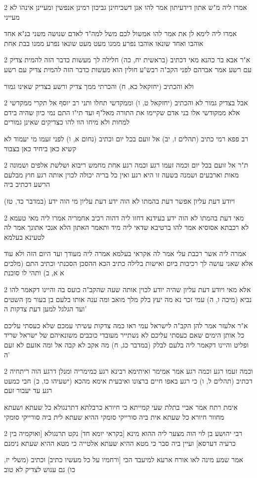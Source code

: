\documentclass[12pt, openany]{book}
\newcommand{\sethebfont}{
\fontsize{10.5pt}{21.0pt} \selectfont
}
\newcommand{\twocol}[1]{
	{\sethebfont \begin{multicols}{2}
			#1
	\end{multicols}}	
}
\begin{document}
\twocol{אמרו ליה מ"ש אתון דידעיתון אמר להו אנן דשכיחינן גביכון רמינן אנפשין ומעיינן אינהו לא מעייני
\par אמרו ליה לימא לן את אמר להו אמשול לכם משל למה"ד לאדם שנושה משני בנ"א אחד אוהבו ואחד שונאו אוהבו נפרע ממנו מעט מעט שונאו נפרע ממנו בבת אחת}
\twocol{א"ר אבא בר כהנא מאי דכתיב (בראשית יח, כה) חלילה לך מעשות כדבר הזה להמית צדיק עם רשע אמר אברהם לפני הקב"ה רבש"ע חולין הוא מעשות כדבר הזה להמית צדיק עם רשע
\par ולא והכתיב (יחזקאל כא, ח) והכרתי ממך צדיק ורשע בצדיק שאינו גמור}
\twocol{אבל בצדיק גמור לא והכתיב (יחזקאל ט, ו) וממקדשי תחלו ותני רב יוסף אל תקרי ממקדשי אלא ממקודשי אלו בני אדם שקיימו את התורה מאל"ף ועד תי"ו התם נמי כיון שהיה בידם למחות ולא מיחו הוו להו כצדיקים שאינן גמורים
\par רב פפא רמי כתיב (תהלים ז, יב) אל זועם בכל יום וכתיב (נחום א, ו) לפני זעמו מי יעמוד לא קשיא כאן ביחיד כאן בצבור}
\twocol{ת"ר אל זועם בכל יום וכמה זעמו רגע וכמה רגע אחת מחמש ריבוא ושלשת אלפים ושמונה מאות וארבעים ושמנה בשעה זו היא רגע ואין כל בריה יכולה לכוין אותה רגע חוץ מבלעם הרשע דכתיב ביה
\par (במדבר כד, טז) ויודע דעת עליון אפשר דעת בהמתו לא הוה ידע דעת עליון מי הוה ידע}
\twocol{מאי דעת בהמתו לא הוה ידע בעידנא דחזו ליה דהוה רכיב אחמריה אמרו ליה מאי טעמא לא רכבתא אסוסיא אמר להו ברטיבא שדאי ליה מיד ותאמר האתון הלא אנכי אתונך אמר לה לטעינא בעלמא
\par אמרה ליה אשר רכבת עלי אמר לה אקראי בעלמא אמרה ליה מעודך ועד היום הזה ולא עוד אלא שאני עושה לך רכיבות ביום ואישות בלילה כתיב הכא ההסכן הסכנתי וכתיב התם (מלכים א א, ב) ותהי לו סוכנת}
\twocol{אלא מאי ויודע דעת עליון שהיה יודע לכוין אותה שעה שהקב"ה כועס בה והיינו דקאמר להו נביא (מיכה ו, ה) עמי זכר נא מה יעץ בלק מלך מואב ומה ענה אותו בלעם בן בעור מן השטים ועד הגלגל למען דעת צדקות ה'
\par א"ר אלעזר אמר להן הקב"ה לישראל עמי ראו כמה צדקות עשיתי עמכם שלא כעסתי עליכם כל אותן הימים שאם כעסתי עליכם לא נשתייר מעובדי כוכבים משונאיהם של ישראל שריד ופליט והיינו דקאמר ליה בלעם לבלק (במדבר כג, ח) מה אקב לא קבה אל ומה אזעם לא זעם ה'}
\twocol{וכמה זעמו רגע וכמה רגע אמר אמימר ואיתימא רבינא רגע כמימריה ומנלן דרגע הוה ריתחיה דכתיב (תהלים ל, ו) כי רגע באפו חיים ברצונו ואיבעית אימא מהכא (ישעיהו כו, כ) חבי כמעט רגע עד יעבור זעם
\par אימת רתח אמר אביי בתלת שעי קמייתא כי חיורא כרבלתא דתרנגולא כל שעתא ושעתא מחוור חיורא כל שעתא אית ביה סורייקי סומקי ההיא שעתא לית ביה סורייקי סומקי}
\twocol{רבי יהושע בן לוי הוה מצער ליה ההוא מינא [בקראי יומא חד] נקט תרנגולא [ואוקמיה בין כרעיה דערסא] ועיין ביה סבר כי מטא ההיא שעתא אלטייה כי מטא ההיא שעתא נימנם
\par אמר שמע מינה לאו אורח ארעא למיעבד הכי [ורחמיו על כל מעשיו כתיב] וכתיב (משלי יז, כו) גם ענוש לצדיק לא טוב}
\end{document}
